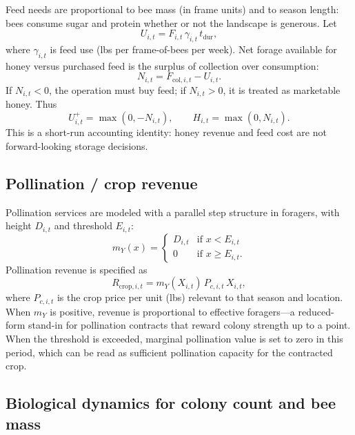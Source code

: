 \documentclass[11pt]{article}
\begin{document}
Feed needs are proportional to bee mass (in frame units) and to season length: bees consume sugar and protein whether or not the landscape is generous. Let
\begin{equation}
U_{i,t} = F_{i,t}\, \gamma_{i,t}\, t_{\mathrm{dur}},
\end{equation}
where $\gamma_{i,t}$ is feed use (lbs per frame-of-bees per week). Net forage available for honey versus purchased feed is the surplus of collection over consumption:
\begin{equation}
N_{i,t} = F_{\mathrm{col},i,t} - U_{i,t}.
\end{equation}
If $N_{i,t}<0$, the operation must buy feed; if $N_{i,t}>0$, it is treated as marketable honey. Thus
\begin{equation}
U^+_{i,t} = \max(0,-N_{i,t}), \qquad
H_{i,t} = \max(0,N_{i,t}).
\end{equation}
This is a short-run accounting identity: honey revenue and feed cost are not forward-looking storage decisions.

\subsection{Pollination / crop revenue}

Pollination services are modeled with a parallel step structure in foragers, with height $D_{i,t}$ and threshold $E_{i,t}$:
\begin{equation}
m_Y(x) = \begin{cases}
D_{i,t} & \text{if } x < E_{i,t} \\
0 & \text{if } x \ge E_{i,t}.
\end{cases}
\end{equation}
Pollination revenue is specified as
\begin{equation}
R_{\mathrm{crop},i,t} = m_Y(X_{i,t})\, P_{c,i,t}\, X_{i,t},
\end{equation}
where $P_{c,i,t}$ is the crop price per unit (lbs) relevant to that season and location. When $m_Y$ is positive, revenue is proportional to effective foragers---a reduced-form stand-in for pollination contracts that reward colony strength up to a point. When the threshold is exceeded, marginal pollination value is set to zero in this period, which can be read as sufficient pollination capacity for the contracted crop.

\subsection{Biological dynamics for colony count and bee mass}
\end{document}
